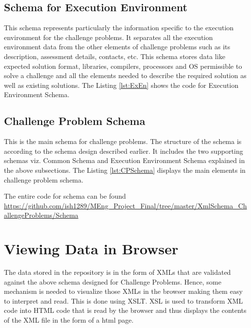 \documentclass[11pt,letterpaper]{report}
\begin{document}


\subsection*{Schema for Execution Environment}
This schema represents particularly the information specific to the execution environment for the challenge problems. It separates all the execution environment data from the other elements of challenge problems such as its description, assessment details, contacts, etc. This schema stores data like expected solution format, libraries, compilers, processors and OS permissible to solve a challenge and  all the elements needed to describe the required solution as well as existing solutions. The Listing \ref{lst:ExEn} shows the code for Execution Environment Schema.



\subsection*{Challenge Problem Schema}
This is the main schema for challenge problems. The structure of the schema is according to the schema design described earlier. It includes the two supporting schemas viz. Common Schema and Execution Environment Schema explained in the above subsections. The Listing \ref{lst:CPSchema} displays the main elements in challenge problem schema.

The entire code for schema can be found \url{https://github.com/ish1289/MEng_Project_Final/tree/master/XmlSchema_ChallengeProblems/Schema
}



\section*{Viewing Data in Browser}
The data stored in the repository is in the form of XMLs that are validated against the above schema designed for Challenge Problems. Hence, some mechanism is needed to visualize those XMLs in the browser making them easy to interpret and read. This is done using XSLT. XSL is used to transform XML code into HTML code that is read by the browser and thus displays the contents of the XML file in the form of a html page. 
\end{document}
